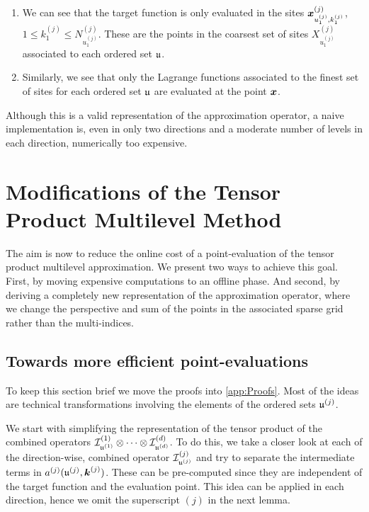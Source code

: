 \documentclass[	a4paper, 
								11pt]{article}
\theoremstyle{plain}
\begin{document}
\begin{remark}\label{rem:OnTPML}
\begin{enumerate}
 \item We can see that the target function is only evaluated in the sites $ \boldsymbol{x}^{(j)}_{u_1^{(j)}, k_1^{(j)}} $,
 $ 1 \leq k_1^{(j)} \leq N_{u_1^{(j)}}^{(j)} $.
 These are the points in the coarsest set of sites $ X^{(j)}_{u_1^{(j)}} $ associated to each ordered set $ \mathfrak{u} $.
 \item Similarly, we see that only the Lagrange functions associated to the finest set of sites for each ordered set $ \mathfrak{u} $ are evaluated at the point $ \boldsymbol{x} $.
\end{enumerate}
\end{remark}

Although this is a valid representation of the approximation operator, a naive implementation is, even in only two directions and a moderate number of levels in each direction, numerically too expensive.

%
%
%

\section{Modifications of the Tensor Product Multilevel Method}\label{sec:ModificationsOfTPML}

The aim is now to reduce the online cost of a point-evaluation of the tensor 
product multilevel approximation. We present two ways to achieve this goal. 
First, by moving expensive computations to an offline phase. And second, by 
deriving a completely new representation of the approximation operator, where
we change the perspective and sum of the points in the associated sparse grid
rather than the multi-indices.

\subsection{Towards more efficient point-evaluations}\label{sec:Efficient
Evaluations}

To keep this section brief we move the proofs into \cref{app:Proofs}. Most of 
the ideas are technical transformations involving the elements of the ordered
sets $ \mathfrak{u}^{(j)} $.

We start with simplifying the representation of the tensor product of the combined
operators $ \mathcal{I}^{(1)}_{\mathfrak{u}^{(1)}} \otimes \cdots \otimes 
\mathcal{I}^{(d)}_{\mathfrak{u}^{(d)}} $. To do this, we take a closer look at each of the
direction-wise, combined operator $ \mathcal{I}^{(j)}_{\mathfrak{u}^{(j)}} $ and try to 
separate the intermediate terms in $ a^{(j)}(\mathfrak{u}^{(j)}, \boldsymbol{k}^{(j)}) $. These
can be pre-computed since they are independent of the target function and the 
evaluation point. This idea can be applied in each direction, hence we omit
the superscript $ (j) $ in the next lemma.
  
\end{document}
